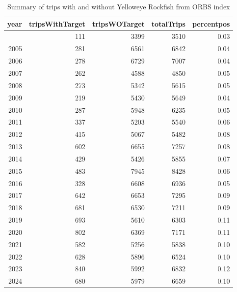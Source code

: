 \documentclass[
]{scrartcl}
\begin{document}
\begin{longtable}{rrrrr}

\caption{\label{tbl-yelloweye_percent_pos_ORBS}Summary of trips with and
without Yelloweye Rockfish from ORBS index}

\tabularnewline

\toprule
year & tripsWithTarget & tripsWOTarget & totalTrips & percentpos \\ 
\midrule\addlinespace[2.5pt]
2004 & 111 & 3399 & 3510 & 0.03 \\ 
2005 & 281 & 6561 & 6842 & 0.04 \\ 
2006 & 278 & 6729 & 7007 & 0.04 \\ 
2007 & 262 & 4588 & 4850 & 0.05 \\ 
2008 & 273 & 5342 & 5615 & 0.05 \\ 
2009 & 219 & 5430 & 5649 & 0.04 \\ 
2010 & 287 & 5948 & 6235 & 0.05 \\ 
2011 & 337 & 5203 & 5540 & 0.06 \\ 
2012 & 415 & 5067 & 5482 & 0.08 \\ 
2013 & 602 & 6655 & 7257 & 0.08 \\ 
2014 & 429 & 5426 & 5855 & 0.07 \\ 
2015 & 483 & 7945 & 8428 & 0.06 \\ 
2016 & 328 & 6608 & 6936 & 0.05 \\ 
2017 & 642 & 6653 & 7295 & 0.09 \\ 
2018 & 681 & 6530 & 7211 & 0.09 \\ 
2019 & 693 & 5610 & 6303 & 0.11 \\ 
2020 & 802 & 6369 & 7171 & 0.11 \\ 
2021 & 582 & 5256 & 5838 & 0.10 \\ 
2022 & 628 & 5896 & 6524 & 0.10 \\ 
2023 & 840 & 5992 & 6832 & 0.12 \\ 
2024 & 680 & 5979 & 6659 & 0.10 \\ 
\bottomrule

\end{longtable}

\endgroup
\end{document}
